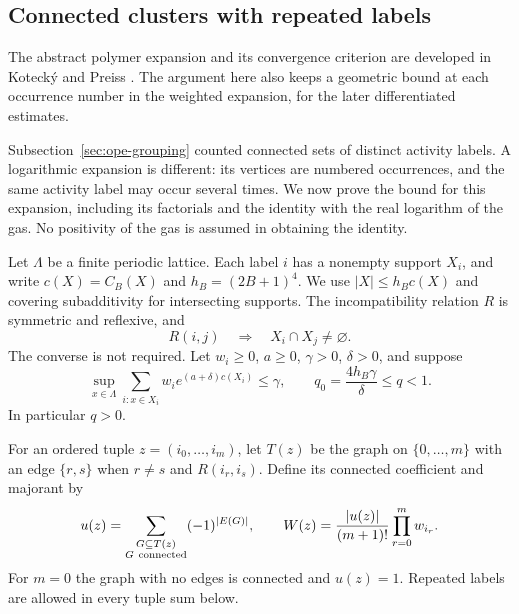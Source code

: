 \subsection{Connected clusters with repeated labels}
\label{sec:cluster-expansion}

The abstract polymer expansion and its convergence criterion are
developed in Koteck\'y and Preiss \cite[the theorem on pp.~492--493]{KoteckyPreiss}.
The argument here also keeps a geometric bound at each occurrence number
in the weighted expansion, for the later differentiated estimates.

Subsection~\ref{sec:ope-grouping} counted connected sets of distinct activity
labels. A logarithmic expansion is different: its vertices are numbered
occurrences, and the same activity label may occur several times. We now
prove the bound for this expansion, including its factorials and the
identity with the real logarithm of the gas. No positivity of the gas is
assumed in obtaining the identity.

Let $\Lambda$ be a finite periodic lattice. Each label $i$ has a nonempty
support $X_i$, and write $c(X)=C_B(X)$ and $h_B=(2B+1)^4$. We use
$|X|\le h_Bc(X)$ and covering subadditivity for intersecting supports.
The incompatibility relation $R$ is symmetric and reflexive, and
\[
                R(i,j)\quad\Longrightarrow\quad X_i\cap X_j\ne\varnothing.
\]
The converse is not required. Let $w_i\ge0$, $a\ge0$, $\gamma>0$,
$\delta>0$, and suppose
\begin{equation}\label{eq:cluster-vertex-input}
 \sup_{x\in\Lambda}\sum_{i:x\in X_i}w_i e^{(a+\delta)c(X_i)}\le\gamma,
 \qquad q_0=\frac{4h_B\gamma}{\delta}\le q<1.
\end{equation}
In particular $q>0$.

For an ordered tuple $z=(i_0,\ldots,i_m)$, let $T(z)$ be the graph
on $\{0,\ldots,m\}$ with an edge $\{r,s\}$ when $r\ne s$ and
$R(i_r,i_s)$. Define its connected coefficient and majorant by
\[
 u(z)=\sum_{\substack{G\subseteq T(z)\\G\ {\rm connected}}}(-1)^{|E(G)|},
 \qquad W(z)=\frac{|u(z)|}{(m+1)!}\prod_{r=0}^m w_{i_r}.
\]
For $m=0$ the graph with no edges is connected and $u(z)=1$.
Repeated labels are allowed in every tuple sum below.

